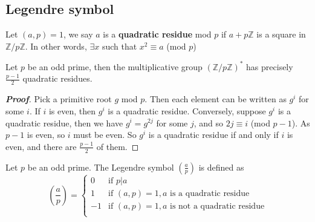 \subsection{Legendre symbol}
\begin{definition} Let $(a,p)=1$, we say $a$ is a {\bf quadratic residue} mod $p$ if $a+p\mathbb{Z}$ is a square in $\mathbb{Z}/p\mathbb{Z}$. In other words, $\exists x$ such that $x^2 \equiv a$ (mod $p$)
\end{definition}
\begin{lemma} Let $p$ be an odd prime, then the multiplicative group $(\mathbb{Z}/p\mathbb{Z})^*$ has precisely $\frac{p-1}{2}$ quadratic residues.
\end{lemma}
\begin{proof}[\bf Proof] Pick a primitive root $g$ mod $p$. Then each element can be written as $g^i$ for some $i$. If $i$ is even, then $g^i$ is a quadratic residue. Conversely, suppose $g^i$ is a quadratic residue, then we have $g^i=g^{2j}$ for some $j$, and so $2j \equiv i$ (mod $p-1$). As $p-1$ is even, so $i$ must be even. So $g^i$ is a quadratic residue if and only if $i$ is even, and there are $\frac{p-1}{2}$ of them.
\end{proof}
\begin{definition} Let $p$ be an odd prime. The Legendre symbol $\left(\frac{a}{p}\right)$ is defined as
\begin{equation*}
\left(\frac{a}{p}\right)= \left\{
\begin{array}{ll}
0 & \text{if } p|a\\
1 & \text{if } (a,p)=1, a \text{ is a quadratic residue} \\
-1 & \text{if } (a,p)=1, a \text{ is not a quadratic residue} \\
\end{array} \right.
\end{equation*}
\end{definition}
